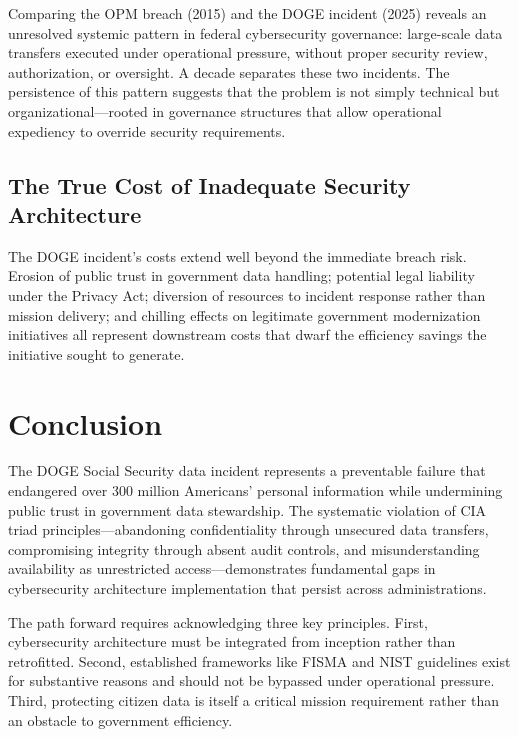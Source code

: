 \documentclass[sigconf,nonacm]{acmart}
\begin{document}
Comparing the OPM breach (2015) and the DOGE incident (2025) reveals an unresolved
systemic pattern in federal cybersecurity governance: large-scale data transfers
executed under operational pressure, without proper security review, authorization, or
oversight. A decade separates these two incidents. The persistence of this pattern
suggests that the problem is not simply technical but organizational---rooted in
governance structures that allow operational expediency to override security
requirements.

\subsection{The True Cost of Inadequate Security Architecture}

The DOGE incident's costs extend well beyond the immediate breach risk. Erosion of
public trust in government data handling; potential legal liability under the Privacy
Act; diversion of resources to incident response rather than mission delivery; and
chilling effects on legitimate government modernization initiatives all represent
downstream costs that dwarf the efficiency savings the initiative sought to generate.

\section{Conclusion}

The DOGE Social Security data incident represents a preventable failure that endangered
over 300 million Americans' personal information while undermining public trust in
government data stewardship. The systematic violation of CIA triad principles---abandoning
confidentiality through unsecured data transfers, compromising integrity through absent
audit controls, and misunderstanding availability as unrestricted access---demonstrates
fundamental gaps in cybersecurity architecture implementation that persist across
administrations.

The path forward requires acknowledging three key principles. First, cybersecurity
architecture must be integrated from inception rather than retrofitted. Second,
established frameworks like FISMA and NIST guidelines exist for substantive reasons
and should not be bypassed under operational pressure. Third, protecting citizen data
is itself a critical mission requirement rather than an obstacle to government efficiency.
\end{document}
